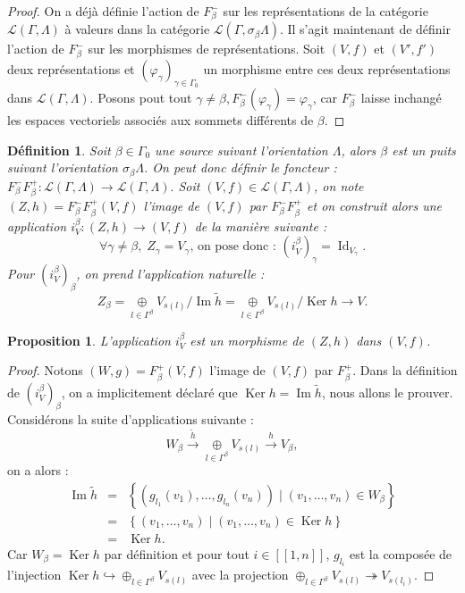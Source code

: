 \documentclass[a4paper,10pt]{article}
\newtheorem{defi}{Définition}[section]
\newtheorem{prop}{Proposition}[section]
\DeclareMathOperator{\Ker}{Ker}
\DeclareMathOperator{\Id}{Id}
\DeclareMathOperator{\Img}{Im}
\begin{document}
\begin{proof}
On a déjà définie l'action de $F_{\beta}^{-}$ sur les représentations de la catégorie $\mathscr L(\Gamma,\Lambda)$ à valeurs dans la catégorie $\mathscr L(\Gamma,\sigma_{\beta}\Lambda)$. Il s'agit maintenant de définir l'action de $F_{\beta}^{-}$ sur les morphismes de représentations. Soit $(V,f)$ et $(V',f')$ deux représentations et $(\varphi_{\gamma})_{\gamma \in \Gamma_{0}}$ un morphisme entre ces deux représentations dans $\mathscr L(\Gamma,\Lambda)$. Posons pout tout $\gamma \neq \beta, F_{\beta}^{-}(\varphi_{\gamma}) = \varphi_{\gamma}$, car $F_{\beta}^{-}$ laisse inchangé les espaces vectoriels associés aux sommets différents de $\beta$.
\end{proof}
\begin{defi}
	Soit $\beta\in\Gamma_{0}$ une source suivant l'orientation $\Lambda$, alors $\beta$ est un puits suivant l'orientation $\sigma_{\beta}\Lambda$. On peut donc définir le foncteur : $F_{\beta}^{-}F_{\beta}^{+}:\mathscr{L}(\Gamma,\Lambda)\rightarrow\mathscr{L}(\Gamma,\Lambda).$ Soit $(V,f)\in\mathscr{L}(\Gamma,\Lambda)$, on note $(Z,h)=F_{\beta}^{-}F_{\beta}^{+}(V,f)$ l'image de $(V,f)$ par $F_{\beta}^{-}F_{\beta}^{+}$ et on construit alors une application $i_{V}^{\beta}:(Z,h)\rightarrow (V,f)$ de la manière suivante :
	\[
		\forall \gamma\neq\beta,\;Z_{\gamma}=V_{\gamma}\text{, on pose donc : }(i_{V}^{\beta})_{\gamma}=\Id_{V_{\gamma}}.
	\]
	Pour $(i_{V}^{\beta})_{\beta}$, on prend l'application naturelle : 
	\[
		Z_{\beta}=\underset{l\in\Gamma^{\beta}}{\oplus} V_{s(l)}/\Img \tilde{h}=\underset{l\in\Gamma^{\beta}}{\oplus} V_{s(l)}/\Ker h \rightarrow V.
	\]
\end{defi}
\begin{prop}
	L'application $i_{V}^{\beta}$ est un morphisme de $(Z,h)$ dans $(V,f)$.
\end{prop}
\begin{proof}
	Notons $(W,g)=F_{\beta}^{+}(V,f)$ l'image de $(V,f)$ par $F_{\beta}^{+}$. Dans la définition de $(i_{V}^{\beta})_{\beta}$, on a implicitement déclaré que $\Ker h=\Img\tilde h$, nous allons le prouver. Considérons la suite d'applications suivante :
	\[
		W_{\beta}\overset{\tilde h}{\longrightarrow}\underset{l\in\Gamma^{\beta}}{\oplus}V_{s(l)}\overset{h}{\longrightarrow}V_{\beta},
	\]
on a alors :
\[
	\begin{array}{lll}
		\Img \tilde h &=& \left\{ (g_{l_{1}}(v_{1}),\dots,g_{l_{n}}(v_{n})) \;|\; (v_{1},\dots,v_{n})\in W_{\beta} \right\}\\
		&=& \left\{ (v_{1},\dots,v_{n})\;|\;(v_{1},\dots,v_{n})\in\Ker h \right\}\\
		&=& \Ker h.
\end{array}
\]
Car $W_{\beta}=\Ker h$ par définition et pour tout $i\in[\![1,n]\!]$, $g_{l_{i}}$ est la composée de l'injection $\Ker h \hookrightarrow \oplus_{l\in\Gamma^{\beta}}V_{s(l)}$ avec la projection $\oplus_{l\in\Gamma^{\beta}}V_{s(l)}\twoheadrightarrow V_{s(l_{i})}$.
\end{proof}
\end{document}
